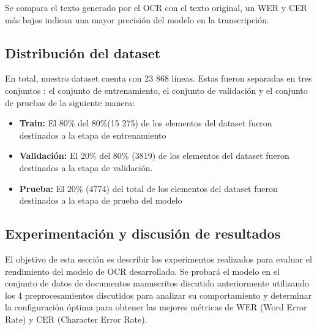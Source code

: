 \documentclass{article}
\begin{document}
Se compara el texto generado por el OCR con el texto original, un WER y CER más bajos indican una mayor precisión del modelo en la transcripción.



\subsection{Distribución del dataset}
En total, nuestro dataset cuenta con 23 868 líneas. Estas fueron separadas en tres conjuntos : el conjunto de entrenamiento, el conjunto de validación y el conjunto de pruebas de la siguiente manera:
\begin{itemize}
    \item \textbf{Train:} El 80\% del 80\%(15 275) de los elementos del dataset fueron destinados a la etapa de entrenamiento

    \item \textbf{Validación:} El 20\% del 80\% (3819) de los elementos del dataset fueron destinados a la etapa de validación.

    \item \textbf{Prueba:} El 20\% (4774) del total de los elementos del dataset fueron destinados a la etapa de prueba del modelo 
\end{itemize}

\subsection{Experimentación y discusión de resultados}
El objetivo de esta sección es describir los experimentos realizados para evaluar el rendimiento del modelo de OCR desarrollado. Se probará el modelo en el conjunto de datos de documentos manuscritos discutido anteriormente utilizando los 4 preprocesamientos discutidos para analizar su comportamiento y determinar la configuración óptima para obtener las mejores métricas de WER (Word Error Rate) y CER (Character Error Rate).
\end{document}
